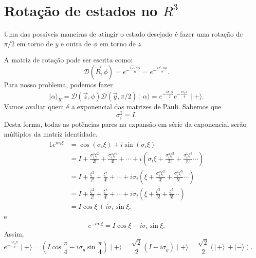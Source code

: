\documentclass{article}
\newcommand{\ket}[1]{\mid\!\! #1 \rangle}
\begin{document}
\section{Rotação de estados no $R^3$}
Uma das possíveis maneiras de atingir o estado desejado é fazer uma rotação de $\pi \slash 2$ em torno de $y$ e outra de $\phi$ em torno de $z$.

A matriz de rotação pode ser escrita como:
\begin{equation}
 \mathcal{D}(\vec{R},\phi) = e^{-\frac{i \vec{J}\cdot \hat{n} \phi}{\hbar}} = e^{-\frac{i \vec{\sigma}\cdot \hat{n} \phi}{2}}\mathrm{.}
\end{equation}
Para nosso problema, podemos fazer
\begin{equation}
 \ket{\alpha}_R = \mathcal{D}(\vec{z},\phi) \mathcal{D}(\vec{y},\pi \slash 2) \ket{\alpha} =
 e^{-\frac{i \sigma_z \phi}{2}} e^{-\frac{i \sigma_y \pi}{4}} \ket{+} \mathrm{.}
\end{equation}
Vamos avaliar quem é a exponencial das matrizes de Pauli. Sabemos que
\begin{equation}
 \sigma_i^2 = I\mathrm{.}
\end{equation}
Desta forma, todas as potências pares na expansão em série da exponencial serão múltiplos da matriz identidade.
\begin{alignat}{1}
\nonumber
 e^{i\sigma_i \xi} &= \cos{(\sigma_i \xi)} + i \sin{(\sigma_i \xi)} \\ \nonumber
 &= I + \frac{\sigma_i^2 \xi^2}{2!} + \frac{\sigma_i^4 \xi^4}{4!} + \cdots + i\left( \sigma_i \xi + \frac{\sigma_i^3 \xi^3}{3!} +
 \frac{\sigma_i^5 \xi^5}{5!} \cdots\right) \\ \nonumber
 &= I + \frac{\xi^2}{2!} + \frac{\xi^4}{4!} + \cdots + i\sigma_i \left(\xi + \frac{\sigma_i^2 \xi^3}{3!} +
 \frac{\sigma_i^4 \xi^5}{5!} \cdots\right) \\ \nonumber
 &= I + \frac{\xi^2}{2!} + \frac{\xi^4}{4!} + \cdots + i\sigma_i \left(\xi + \frac{\xi^3}{3!} +
 \frac{\xi^5}{5!} \cdots\right) \\
 &= I \cos{\xi} + i \sigma_i \sin{\xi}\mathrm{,}
\end{alignat}
e
\begin{equation}
 e^{-i\sigma_i \xi} = I \cos{\xi} - i \sigma_i \sin{\xi}\mathrm{.}
\end{equation}
Assim,
\begin{equation}
 e^{-\frac{i \sigma_y \pi}{4}} \ket{+} = \left( I \cos{\frac{\pi}{4}} - i \sigma_y \sin{\frac{\pi}{4}} \right) \ket{+} =
 \frac{\sqrt{2}}{2}\left( I - i \sigma_y \right)\ket{+} = \frac{\sqrt{2}}{2}\left( \ket{+} \ + \ket{-} \right) \mathrm{.}
\end{equation}
\end{document}
